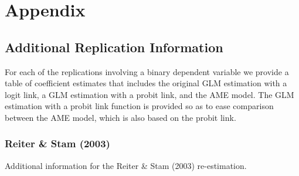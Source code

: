\clearpage

\renewcommand{\thefigure}{A\arabic{figure}}
\setcounter{figure}{0}
\renewcommand{\thetable}{A.\arabic{table}}
\setcounter{table}{0}
\renewcommand{\thesection}{A.\arabic{section}}
\setcounter{section}{0}

\section*{\textbf{Appendix}}

\subsection*{Additional Replication Information}

For each of the replications involving a binary dependent variable we provide a table of coefficient estimates that includes the original GLM estimation with a logit link, a GLM estimation with a probit link, and the AME model. The GLM estimation with a probit link function is provided so as to ease comparison between the AME model, which is also based on the probit link. %


\clearpage
\subsubsection*{Reiter \& Stam (2003)}

Additional information for the Reiter \& Stam (2003) re-estimation. 


\FloatBarrier

\FloatBarrier
\clearpage

